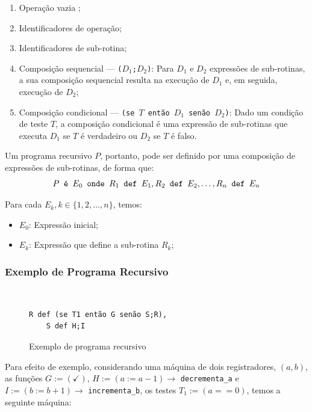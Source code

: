\documentclass[12pt,fleqn]{article}
\begin{document}
\begin{enumerate}
    \item Operação vazia \checkmark;
    \item Identificadores de operação;
    \item Identificadores de sub-rotina;
    \item Composição sequencial --- \texttt{($D_1$;$D_2$)}: Para $D_1$ e $D_2$
    expressões de sub-rotinas, a sua composição sequencial resulta na execução
    de $D_1$ e, em seguida, execução de $D_2$;
    \item Composição condicional --- \texttt{(se $T$ então $D_1$ senão $D_2$)}:
    Dado um condição de teste $T$, a composição condicional é uma expressão de
    sub-rotinas que executa $D_1$ se $T$ é verdadeiro ou $D_2$ se $T$ é falso.
\end{enumerate}

Um programa recursivo $P$, portanto, pode ser definido por uma composição de
expressões de sub-rotinas, de forma que:
\[
    P \text{\tt\ é\ } E_0 \text{\tt\ onde\ } R_1 \text{\tt\ def\ } E_1, R_2
    \text{\tt\ def\ } E_2, \dots, R_n \text{\tt\ def\ } E_n
\]

Para cada $E_k, k \in \{1, 2, \dots, n\}$, temos:

\begin{itemize}
    \item $E_0$: Expressão inicial;
    \item $E_k$: Expressão que define a sub-rotina $R_k$;
\end{itemize}

\subsubsection{Exemplo de Programa Recursivo}
~ %

\begin{figure}[H]
\begin{Verbatim}[commandchars=\\\{\},codes={\catcode`\$=3\catcode`\^=7}]
    R def (se T1 então G senão S;R),
    S def H;I
\end{Verbatim}
\caption{Exemplo de programa recursivo}
\end{figure}

Para efeito de exemplo, considerando uma máquina de dois registradores, $(a,b)$,
as funções $G := (\checkmark)$, $H := (a := a-1) \rightarrow$
\verb|decrementa_a| e $I := (b := b+1) \rightarrow$ \verb|incrementa_b|, os
testes $T_1 := (a == 0)$, temos a seguinte máquina:
\end{document}
